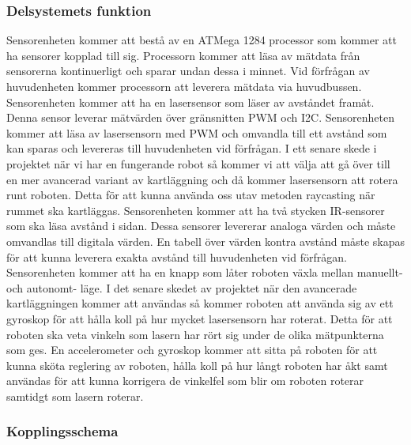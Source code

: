 \documentclass{article}
\begin{document}
\subsubsection{Delsystemets funktion}

Sensorenheten kommer att bestå av en ATMega 1284 processor som kommer att ha sensorer kopplad till sig. Processorn kommer att läsa av mätdata från sensorerna kontinuerligt och sparar undan dessa i minnet. Vid förfrågan av huvudenheten kommer processorn att leverera mätdata via huvudbussen. 
\newline\newline
Sensorenheten kommer att ha en lasersensor som läser av avståndet framåt. Denna sensor leverar mätvärden över gränsnitten PWM och I2C. Sensorenheten kommer att läsa av lasersensorn med PWM och omvandla till ett avstånd som kan sparas och levereras till huvudenheten vid förfrågan. I ett senare skede i projektet när vi har en fungerande robot så kommer vi att välja att gå över till en mer avancerad variant av kartläggning och då kommer lasersensorn att rotera runt roboten. Detta för att kunna använda oss utav metoden raycasting när rummet ska kartläggas.
\newline\newline
Sensorenheten kommer att ha två stycken IR-sensorer som ska läsa avstånd i sidan. Dessa sensorer levererar analoga värden och måste omvandlas till digitala värden. En tabell över värden kontra avstånd måste skapas för att kunna leverera exakta avstånd till huvudenheten vid förfrågan. 
\newline\newline
Sensorenheten kommer att ha en knapp som låter roboten växla mellan manuellt- och autonomt- läge.
\newline\newline
I det senare skedet av projektet när den avancerade kartläggningen kommer att användas så kommer roboten att använda sig av ett gyroskop för att hålla koll på hur mycket lasersensorn har roterat. Detta för att roboten ska veta vinkeln som lasern har rört sig under de olika mätpunkterna som ges.
\newline\newline
En accelerometer och gyroskop kommer att sitta på roboten för att kunna sköta reglering av roboten, hålla koll på hur långt roboten har åkt samt användas för att kunna korrigera de vinkelfel som blir om roboten roterar samtidgt som lasern roterar.

\subsubsection{Kopplingsschema}
\end{document}
